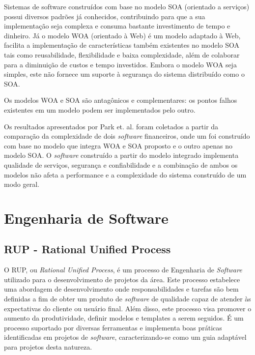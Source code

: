 Sistemas de software construídos com base no modelo SOA (orientado a serviços) possui diversos padrões já conhecidos, contribuindo para que a sua implementação seja complexa e consuma bastante investimento de tempo e dinheiro. Já o modelo WOA (orientado à Web) é um modelo adaptado à Web, facilita a implementação de características também existentes no modelo SOA tais como reusabilidade, flexibilidade e baixa complexidade, além de colaborar para a diminuição de custos e tempo investidos. Embora o modelo WOA seja simples, este não fornece um suporte à segurança do sistema distribuído como o SOA.

Os modelos WOA e SOA são antagônicos e complementares: os pontos falhos existentes em um modelo podem ser implementados pelo outro.

Os resultados apresentados por Park et. al. \cite{park_integrated_2012} foram coletados a partir da comparação da complexidade de dois \textit{software} financeiros, onde um foi construído com base no modelo que integra WOA e SOA proposto e o outro apenas no modelo SOA. O \textit{software} construído a partir do modelo integrado implementa qualidade de serviços, segurança e confiabilidade e a combinação de ambos os modelos não afeta a performance e a complexidade do sistema construído de um modo geral.

\section{Engenharia de Software}

\subsection{RUP - Rational Unified Process}

O RUP, ou \textit{Rational Unified Process}, é um processo de Engenharia de \textit{Software} utilizado para o desenvolvimento de projetos da área. Este processo estabelece uma abordagem de desenvolvimento onde responsabilidades e tarefas são bem definidas a fim de obter um produto de \textit{software} de qualidade capaz de atender às expectativas do cliente ou usuário final. Além disso, este processo visa promover o aumento da produtividade, definir modelos e templates a serem seguidos. É um processo suportado por diversas ferramentas e implementa boas práticas identificadas em projetos de \textit{software}, caracterizando-se como um guia adaptável para projetos desta natureza\cite{rational_software_rational_1998}.

